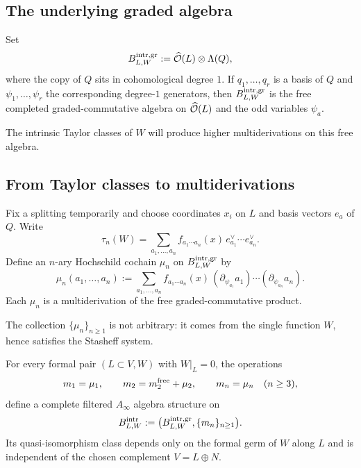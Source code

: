 \subsection{The underlying graded algebra}

Set
\[
B^{\mathrm{intr},\operatorname{gr}}_{L,W}:=\widehat{\mathcal O}(L)\otimes \Lambda(Q),
\]
where the copy of $Q$ sits in cohomological degree $1$. If $q_1,\dots,q_r$ is a basis of $Q$ and $\psi_1,\dots,\psi_r$ the corresponding degree-$1$ generators, then $B^{\mathrm{intr},\operatorname{gr}}_{L,W}$ is the free completed graded-commutative algebra on $\widehat{\mathcal O}(L)$ and the odd variables $\psi_a$.

The intrinsic Taylor classes of $W$ will produce higher multiderivations on this free algebra.

\subsection{From Taylor classes to multiderivations}

Fix a splitting temporarily and choose coordinates $x_i$ on $L$ and basis vectors $e_a$ of $Q$. Write
\[
\tau_n(W)=\sum_{a_1,\dots,a_n} f_{a_1\cdots a_n}(x)\, e_{a_1}^\vee\cdots e_{a_n}^\vee.
\]
Define an $n$-ary Hochschild cochain $\mu_n$ on $B^{\mathrm{intr},\operatorname{gr}}_{L,W}$ by
\begin{equation}%
\mu_n(a_1,\dots,a_n)
:=
\sum_{a_1,\dots,a_n}
f_{a_1\cdots a_n}(x)\,
(\partial_{\psi_{a_1}}a_1)\cdots(\partial_{\psi_{a_n}}a_n).
\end{equation}
Each $\mu_n$ is a multiderivation of the free graded-commutative product.

The collection $\{\mu_n\}_{n\ge 1}$ is not arbitrary: it comes from the single function $W$, hence satisfies the Stasheff system.

\begin{theorem}%
For every formal pair $(L\subset V,W)$ with $W|_L=0$, the operations
\[
m_1=\mu_1,\qquad
m_2=m_2^{\mathrm{free}}+\mu_2,\qquad
m_n=\mu_n\quad (n\ge 3),
\]
define a complete filtered $A_\infty$ algebra structure on
\[
B^{\mathrm{intr}}_{L,W}:= \bigl(B^{\mathrm{intr},\operatorname{gr}}_{L,W},\{m_n\}_{n\ge 1}\bigr).
\]
Its quasi-isomorphism class depends only on the formal germ of $W$ along $L$ and is independent of the chosen complement $V=L\oplus N$.
\end{theorem}

